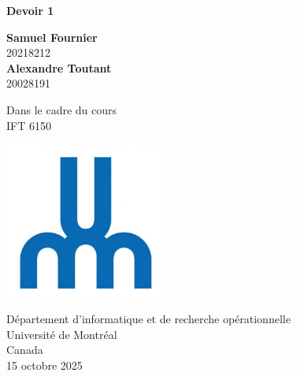 \documentclass{article}
\begin{document}
\begin{titlepage}
	\begin{center}
		\vspace*{1cm}

		\Huge
		\textbf{Devoir 1}

		\vspace{0.5cm}
		\LARGE

		\vspace{1.5cm}

        
		\textbf{Samuel Fournier}\\20218212 \\
		\vfill
		\textbf{Alexandre Toutant}\\20028191 \\
		\vfill


		Dans le cadre du cours\\
		IFT 6150


		\vspace{0.8cm}

		\includegraphics[width=0.4\textwidth]{udem.jpg}

		\Large
		Département d'informatique et de recherche opérationnelle\\
		Université de Montréal\\
		Canada\\
		15 octobre 2025

	\end{center}
\end{titlepage}
\end{document}
